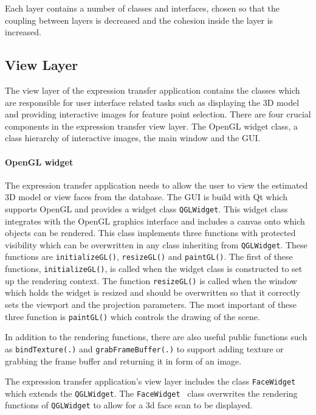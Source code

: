 \documentclass[11pt,a4paper]{report}
\begin{document}
Each layer contains a number of classes and interfaces, chosen so that the coupling
between layers is decreased and the cohesion inside the layer is increased. 

\subsection{View Layer}
The view layer of the expression transfer application contains the classes which
are responsible for user interface related tasks such as displaying the 3D model
and providing interactive images for feature point selection. There are four
crucial components in the expression transfer view layer. The
OpenGL widget class, a class hierarchy of interactive images, the main
window and the GUI.

\paragraph{OpenGL widget}
The expression transfer application needs to allow the user to view the
estimated 3D model or view faces from the database. The GUI is build with Qt
which supports OpenGL and provides a widget class \texttt{QGLWidget}. This
widget class integrates with the OpenGL graphics interface and includes a canvas
onto which objects can be rendered. This class implements three functions with
protected visibility which
can be overwritten in any class inheriting from \texttt{QGLWidget}. These
functions are \texttt{initializeGL()}, \texttt{resizeGL()} and
\texttt{paintGL()}. The first of these functions, \texttt{initializeGL()}, is
called when the widget class is constructed to set up the rendering context. The function \texttt{resizeGL()} is
called when the window which holds the widget is resized and should be
overwritten so that it correctly sets the viewport and the projection parameters. The most important of
these three function is \texttt{paintGL()} which controls the drawing of the
scene.

In addition to the rendering functions, there are also useful public functions
such as \texttt{bindTexture(.)} and \texttt{grabFrameBuffer(.)} to support
adding texture or grabbing the frame buffer and returning it in form of an
image.

The expression transfer application's view layer includes the class
\texttt{FaceWidget} which extends the \texttt{QGLWidget}. The \texttt{FaceWidget
} class overwrites the rendering functions of \texttt{QGLWidget} to allow for a
3d face scan to be displayed.
\end{document}
